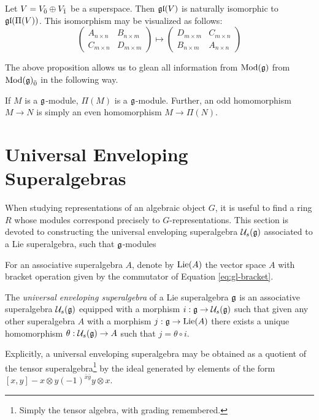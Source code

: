 \begin{proposition}
  Let $V = {V}_{\bar{0}} \oplus {V}_{\bar{1}}$ be a superspace. Then $\mathfrak{gl}(V)$ is naturally isomorphic to $\mathfrak{gl}(\Pi(V))$. This isomorphism may be visualized as follows:
\begin{equation}
    \left(
      \begin{array}{c|c}
        A_{n \times n} & B_{n \times m} \\
        \hline
        C_{m \times n} & D_{m \times m}
      \end{array}
    \right)
    \mapsto
    \left(
      \begin{array}{c|c}
        D_{m \times m} & C_{m \times n} \\
        \hline
        B_{n \times m} & A_{n \times n}
      \end{array}
    \right)
\end{equation}
  
  \end{proposition}

The above proposition allows us to glean all information from $\operatorname{Mod}(\mathfrak{g})$ from ${\operatorname{Mod}(\mathfrak{g})}_{\bar{0}}$ in the following way.
\begin{corollary}
  If $M$ is a $\mathfrak{g}$-module, $\Pi(M)$ is a $\mathfrak{g}$-module. Further, an odd homomorphism $M \to N$ is simply an even homomorphism $M \to \Pi(N)$.
\end{corollary}


\section{Universal Enveloping Superalgebras}
\label{sec:universal-enveloping-superalgebras}

When studying representations of an algebraic object $G$, it is useful to find a ring $R$ whose modules correspond precisely to $G$-representations. This section is devoted to constructing the universal enveloping superalgebra $\mathcal{U}_s(\mathfrak{g})$ associated to a Lie superalgebra, such that $\mathfrak{g}$-modules 
\begin{definition}
  For an associative superalgebra $A$, denote by $\operatorname{Lie}(A)$ the vector space $A$ with bracket operation given by the commutator of Equation \ref{eq:gl-bracket}.

  
  The \emph{universal enveloping superalgebra} of a Lie superalgebra $\mathfrak{g}$ is an associative superalgebra $\mathcal{U}_s(\mathfrak{g})$ equipped with a morphism $i: \mathfrak{g} \to \mathcal{U}_s(\mathfrak{g})$ such that given any other superalgebra $A$ with a morphism $j: \mathfrak{g} \to \operatorname{Lie}(A)$ there exists a unique homomorphism $\theta: \mathcal{U}_s(\mathfrak{g}) \to A$ such that $j = \theta \circ i$.

  Explicitly, a universal enveloping superalgebra may be obtained as a quotient of the tensor superalgebra\footnote{Simply the tensor algebra, with grading remembered.} by the ideal generated by elements of the form $[x,y] - x \otimes y (-1)^{\bar x \bar y} y \otimes x$.
\end{definition}

